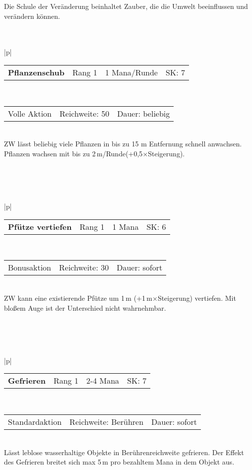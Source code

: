 \documentclass[../../Heldenanleitung2]{subfiles}
\begin{document}
Die Schule der Veränderung beinhaltet Zauber, die die Umwelt beeinflussen und verändern können.
\\\\\\
\begin{tabular}{|p{\textwidth}|}
\hline
\begin{tabularx}{\textwidth}{X|X|X|X}
\textbf{Pflanzenschub} & Rang 1 & 1 Mana/Runde & SK: 7
\end{tabularx} \\ \hline
\begin{tabularx}{\textwidth}{X|X|X}
Volle Aktion & Reichweite: 50 & Dauer: beliebig
\end{tabularx} \\ \hline
ZW lässt beliebig viele Pflanzen in bis zu 15 m Entfernung schnell anwachsen. Pflanzen wachsen mit bis zu 2\,m/Runde(+0,5$\times$Steigerung).
\\ \hline
\end{tabular}
\\\\\\
\begin{tabular}{|p{\textwidth}|}
\hline
\begin{tabularx}{\textwidth}{X|X|X|X}
\textbf{Pfütze vertiefen} & Rang 1 & 1 Mana & SK: 6
\end{tabularx} \\ \hline
\begin{tabularx}{\textwidth}{X|X|X}
Bonusaktion & Reichweite: 30 & Dauer: sofort
\end{tabularx} \\ \hline
ZW kann eine existierende Pfütze um 1\,m (+1\,m$\times$Steigerung) vertiefen. Mit bloßem Auge ist der Unterschied nicht wahrnehmbar.
\\ \hline
\end{tabular}
\\\\\\
\begin{tabular}{|p{\textwidth}|}
\hline
\begin{tabularx}{\textwidth}{X|X|X|X}
\textbf{Gefrieren} & Rang 1 & 2-4 Mana & SK: 7
\end{tabularx} \\ \hline
\begin{tabularx}{\textwidth}{X|X|X}
Standardaktion & Reichweite: Berühren & Dauer: sofort
\end{tabularx} \\ \hline
Lässt leblose wasserhaltige Objekte in Berührenreichweite gefrieren. Der Effekt des Gefrieren breitet sich max 5\,m pro bezahltem Mana in dem Objekt aus.
\\ \hline
\end{tabular}
\end{document}
